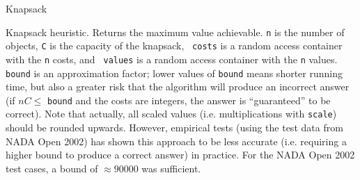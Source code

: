 \categorycontents{}



\begin{algorithm}{Knapsack}

\desc
Knapsack heuristic. Returns the maximum value achievable. {\tt n} is
the number of objects, {\tt C} is the capacity of the knapsack, {\tt
costs} is a random access container with the {\tt n} costs, and {\tt
values} is a random access container with the {\tt n} values. {\tt
bound} is an approximation factor; lower values of {\tt bound} means
shorter running time, but also a greater risk that the algorithm will
produce an incorrect answer (if $nC \le $ {\tt bound} and the costs
are integers, the answer is ``guaranteed'' to be correct). Note that
actually, all scaled values (i.e. multiplications with {\tt scale})
should be rounded upwards. However, empirical tests (using the test
data from NADA Open 2002) has shown this approach to be less accurate
(i.e. requiring a higher bound to produce a correct answer) in
practice. For the NADA Open 2002 test cases, a bound of $\approx
90000$ was sufficient.

\end{algorithm}

